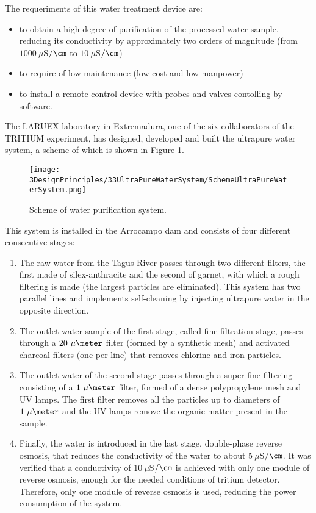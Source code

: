 The requeriments of this water treatment device are:

\begin{itemize}

\item{} to obtain a high degree of purification of the processed water sample, reducing its conductivity by approximately two orders of magnitude (from $1000~\mu$S$/\cm$ to $10~\mu$S$/\cm$)

\item{} to require of low maintenance (low cost  and low manpower)

\item{} to install a remote control device with probes and valves contolling by software.
\end{itemize}

The LARUEX laboratory in Extremadura, one of the six collaborators of the TRITIUM experiment, has designed, developed and built the ultrapure water system, a scheme of which is shown in Figure \ref{fig:WPSScheme}.

\begin{figure}[htbp]
\centering
\texttt{[image: 3DesignPrinciples/33UltraPureWaterSystem/SchemeUltraPureWaterSystem.png]}
\caption{Scheme of water purification system.\label{fig:WPSScheme}}
\end{figure}

This system is installed in the Arrocampo dam and consists of four different consecutive stages:

\begin{enumerate}
\item{} The raw water from the Tagus River passes through two different filters, the first made of silex-anthracite and the second of garnet, with which a rough filtering is made (the largest particles are eliminated). This system has two parallel lines and implements self-cleaning by injecting ultrapure water in the opposite direction.

\item{} The outlet water sample of the first stage, called fine filtration stage, passes through a $20~\mu\meter$ filter (formed by a synthetic mesh) and activated charcoal filters (one per line) that removes chlorine and iron particles.

\item{} The outlet water of the second stage passes through a super-fine filtering consisting of a $1~\mu\meter$ filter, formed of a dense polypropylene mesh and UV lamps. The first filter removes all the particles up to diameters of $1~\mu\meter$ and the UV lamps remove the organic matter present in the sample.

\item{} Finally, the water is introduced in the last stage, double-phase reverse osmosis, that reduces the conductivity of the water to about $5~\mu$S$/\cm$. It was verified that a conductivity of $10~\mu$S$/\cm$ is achieved with only one module of reverse osmosis, enough for the needed conditions of tritium detector. Therefore, only one module of reverse osmosis is used, reducing the power consumption of the system.

\end{enumerate}

